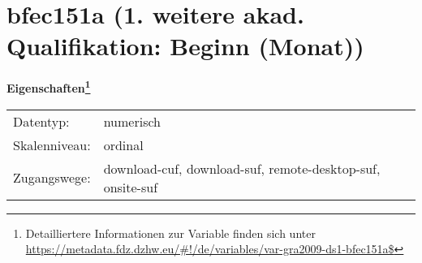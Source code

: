
    \setcounter{footnote}{0}

    \vspace*{-1.8cm}
	\section{bfec151a (1. weitere akad. Qualifikation: Beginn (Monat))}
	\label{section:bfec151a}



    \vspace*{0.5cm}
    \noindent\textbf{Eigenschaften\footnote{Detailliertere Informationen zur Variable finden sich unter
		\url{https://metadata.fdz.dzhw.eu/\#!/de/variables/var-gra2009-ds1-bfec151a$}}}\\
	\begin{tabularx}{\hsize}{@{}lX}
	Datentyp: & numerisch \\
	Skalenniveau: & ordinal \\
	Zugangswege: &
	  download-cuf, 
	  download-suf, 
	  remote-desktop-suf, 
	  onsite-suf
 \\
    \end{tabularx}



